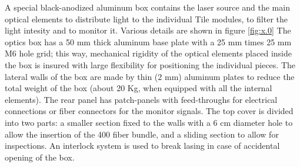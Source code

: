 A special black-anodized aluminum box contains the laser source and the main optical
elements to distribute light to the individual Tile modules, to filter the light
intesity and to monitor it. Various details are shown in figure \ref{fig:x.0} The
optics box has a 50 mm thick aluminum base plate with a 25 mm times 25 mm M6 hole
grid; this way, mechanical rigidity of the optical elements 
placed inside the box is insured with large flexibility for positioning the
individual pieces. The lateral walls of the box are made by thin (2 mm) aluminum
plates to
reduce the total weight of the box (about 20 Kg, when equipped with all the internal
elements). The rear panel has patch-panels with feed-throughs for electrical
connections or fiber connectors for the monitor signals. The top cover is divided
into two parts: a smaller section fixed to the walls with a 6 cm diameter hole to
allow the insertion of the 400 fiber bundle, and a sliding section to allow for
inspections.  An interlock system is used to break lasing in case of accidental
opening of the box. 

